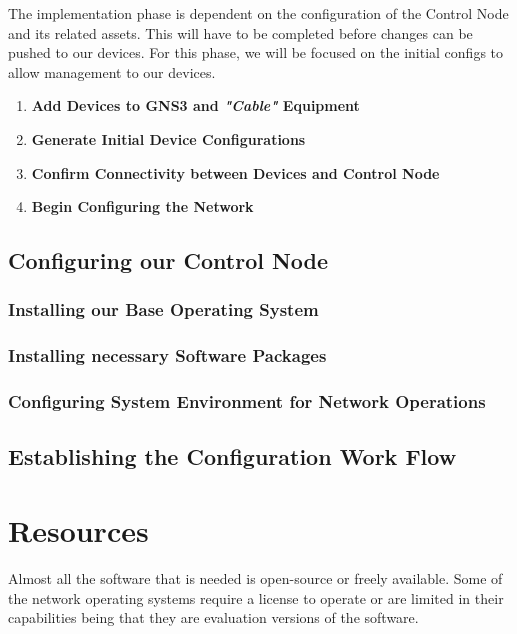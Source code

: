 \documentclass[12pt, letterpaper]{article}
\begin{document}
The implementation phase is dependent on the configuration of the Control Node and its related assets. This will have to be completed before changes can be pushed to our devices. For this phase, we will be focused on the initial configs to allow management to our devices.

\begin{enumerate}
\item \textbf{Add Devices to GNS3 and \textit{"Cable"} Equipment}
\item \textbf{Generate Initial Device Configurations}
\item \textbf{Confirm Connectivity between Devices and Control Node}
\item \textbf{Begin Configuring the Network}
\end{enumerate}


\subsection{Configuring our Control Node}
	
	\subsubsection{Installing our Base Operating System}
	
	\subsubsection{Installing necessary Software Packages}
	
	\subsubsection{Configuring System Environment for Network Operations}

	\subsection{Establishing the Configuration Work Flow}

	
		
		

\newpage

\section{Resources}

Almost all the software that is needed is open-source or freely available. Some of the network operating systems require a license to operate or are limited in their capabilities being that they are evaluation versions of the software.
	
\end{document}
